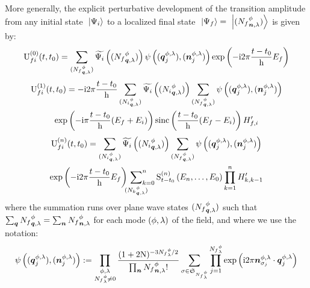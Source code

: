 More generally, the explicit perturbative development of the transition amplitude from any initial state $\ket{\Psi_i}$ to a localized final state $\ket{\Psi_f} = \ket{\bFX {N_f} \pt \n \sp}$ is given by:
\begin{equation*}
\Umn f i 0 t {t_0} = \sum_{\bFQ {N_f} \pt \q \sp} \FT{\Psi_i} \left( \bFQ {N_f} \pt \q \sp \right) \psi \left( ( \q^{\pt, \sp}_j ), ( \n^{\pt, \sp}_j ) \right) \exp{-\i 2 \pi \frac{t - t_0} \h E_f}
\end{equation*}
\begin{multline*}
\Umn f i 1 t {t_0} = -\i 2 \pi \frac{t - t_0} \h \sum_{\bFQ {N_i} \pt \q \sp} \FT{\Psi_i} \left( \bFQ {N_i} \pt \q \sp \right) \sum_{\bFQ {N_f} \pt \q \sp} \psi \left( ( \q^{\pt, \sp}_j ), ( \n^{\pt, \sp}_j ) \right) \\
\exp{-\i \pi \frac{t - t_0} \h ( E_f + E_i )} \sinc{\frac{t - t_0} \h ( E_f - E_i )} H'_{f,i}
\end{multline*}
\begin{multline*}
\Umn f i n t {t_0} = \sum_{\bFQ {N_i} \pt \q \sp} \FT{\Psi_i} \left( \bFQ {N_i} \pt \q \sp \right) \sum_{\bFQ {N_f} \pt \q \sp} \psi \left( ( \q^{\pt, \sp}_j ), ( \n^{\pt, \sp}_j ) \right) \\
\exp{-\i 2 \pi \frac{t - t_0} \h E_f} \sideset{}{_{k=0}^n}\sum_{\bFQ {N_k} \pt \q \sp} \SmE n {E_n, \dotsc, E_0} \prod_{k=1}^n H'_{k,k-1}
\end{multline*}
where the summation runs over plane wave states $\bFQ {N_f} \pt \q \sp$ such that $\sum_{\q} \bQ {N_f} \pt \q \sp = \sum_{\n} \bX {N_f} \pt \n \sp$ for each mode $( \pt, \sp )$ of the field, and where we use the notation:
\begin{equation*}
\psi \left( ( \q^{\pt, \sp}_j ), ( \n^{\pt, \sp}_j ) \right) \eqdef \prod_{\substack{\pt, \sp \\ {N_f}^\pt_\sp \neq 0}} \frac{(1+2 \N)^{-3 {N_f}^\pt_\sp / 2} }{\prod_{\n} \bX {N_f} \pt \n \sp !} \sum_{\sigma \in \mathfrak{S}_{{N_f}^\pt_\sp}} \prod_{j = 1}^{{N_f}^\pt_\sp} \exp{\i 2 \pi \n^{\pt, \sp}_{\sigma_j} \ssp \q^{\pt, \sp}_j}
\end{equation*}
